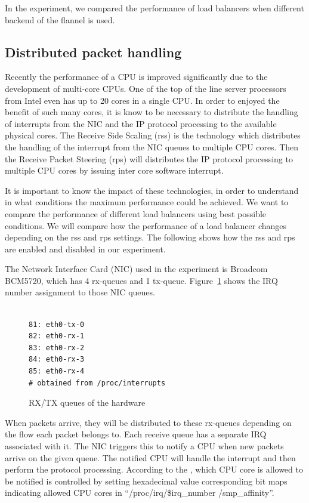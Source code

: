 In the experiment, we compared the performance of load balancers when different backend of the flannel is used. 


\subsection{Distributed packet handling}

Recently the performance of a CPU is improved significantly due to the development of multi-core CPUs.
One of the top of the line server processors from Intel even has up to 20 cores in a single CPU.
In order to enjoyed the benefit of such many cores, 
it is know to be necessary to distribute the handling of interrupts from the NIC and the IP protocol processing
to the available physical cores.
The Receive Side Scaling (rss)\cite{TomHerbert} is the technology 
which distributes the handling of the interrupt from the NIC queues to multiple CPU cores.
Then the Receive Packet Steering (rps)\cite{TomHerbert} will distributes the IP protocol processing 
to multiple CPU cores by issuing inter core software interrupt.

It is important to know the impact of these technologies, 
in order to understand in what conditions the maximum performance could be achieved.
We want to compare the performance of different load balancers using best possible conditions.
We will compare how the performance of a load balancer changes depending on the rss and rps settings.
The following shows how the rss and rps are enabled and disabled in our experiment. 

The Network Interface Card (NIC) used in the experiment is Broadcom BCM5720, which has 4 rx-queues and 1 tx-queue.
Figure~\ref{fig:rx-queue} shows  the IRQ number assignment to those NIC queues.
 
\begin{figure}
\begin{minipage}{0.8\columnwidth}
\small
\begin{verbatim}

81: eth0-tx-0
82: eth0-rx-1
83: eth0-rx-2
84: eth0-rx-3
85: eth0-rx-4
# obtained from /proc/interrupts 

\end{verbatim}
\end{minipage}
\caption{RX/TX queues of the hardware}
\label{fig:rx-queue}
\end{figure}

When packets arrive, they will be distributed to these rx-queues depending on the flow each packet belongs to.
Each receive queue has a separate IRQ associated with it. The NIC triggers
this to notify a CPU when new packets arrive on the given queue.
The notified CPU will handle the interrupt and then perform the protocol processing. 
According to the \cite{TomHerbert}, which CPU core is allowed to be notified is controlled by setting 
hexadecimal value corresponding bit maps indicating allowed CPU cores in \enquote{/proc/irq/\$irq\_number /smp\_affinity}.

